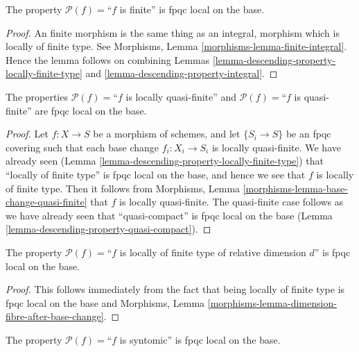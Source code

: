 \begin{lemma}
\label{lemma-descending-property-finite}
The property $\mathcal{P}(f) =$``$f$ is finite''
is fpqc local on the base.
\end{lemma}

\begin{proof}
An finite morphism is the same thing as an integral,
morphism which is locally of finite type. See
Morphisms, Lemma \ref{morphisms-lemma-finite-integral}.
Hence the lemma follows on combining
Lemmas \ref{lemma-descending-property-locally-finite-type}
and \ref{lemma-descending-property-integral}.
\end{proof}

\begin{lemma}
\label{lemma-descending-property-quasi-finite}
The properties
$\mathcal{P}(f) =$``$f$ is locally quasi-finite''
and
$\mathcal{P}(f) =$``$f$ is quasi-finite''
are fpqc local on the base.
\end{lemma}

\begin{proof}
Let $f : X \to S$ be a morphism of schemes, and let $\{S_i \to S\}$
be an fpqc covering such that each base change
$f_i : X_i \to S_i$ is locally quasi-finite.
We have already seen
(Lemma \ref{lemma-descending-property-locally-finite-type})
that ``locally of finite type'' is fpqc local
on the base, and hence we see that $f$ is locally of finite type.
Then it follows from
Morphisms, Lemma \ref{morphisms-lemma-base-change-quasi-finite}
that $f$ is locally quasi-finite. The quasi-finite case follows
as we have already seen that ``quasi-compact'' is fpqc local on the base
(Lemma \ref{lemma-descending-property-quasi-compact}).
\end{proof}

\begin{lemma}
\label{lemma-descending-property-relative-dimension-d}
The property $\mathcal{P}(f) =$``$f$ is locally of finite type
of relative dimension $d$'' is fpqc local on the base.
\end{lemma}

\begin{proof}
This follows immediately from the fact that being locally of finite
type is fpqc local on the base and
Morphisms, Lemma \ref{morphisms-lemma-dimension-fibre-after-base-change}.
\end{proof}

\begin{lemma}
\label{lemma-descending-property-syntomic}
The property $\mathcal{P}(f) =$``$f$ is syntomic''
is fpqc local on the base.
\end{lemma}

